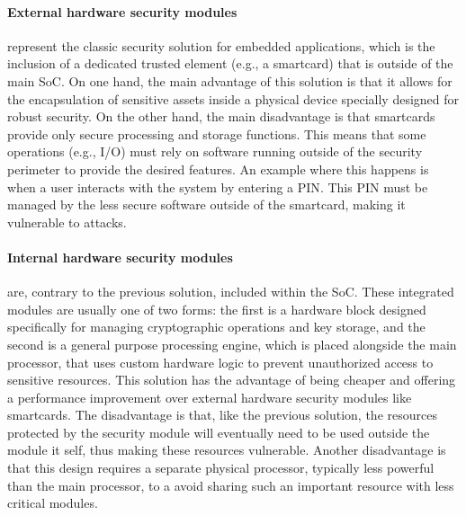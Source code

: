 \paragraph{\textbf{External hardware security modules}} represent the classic security solution for embedded applications, which is the inclusion of a dedicated trusted element (e.g., a smartcard) that is outside of the main \ac{SoC}. On one hand, the main advantage of this solution is that it allows for the encapsulation of sensitive assets inside a physical device specially designed for robust security. On the other hand, the main disadvantage is that smartcards provide only secure processing and storage functions. This means that some operations (e.g., I/O) must rely on software running outside of the security perimeter to provide the desired features. An example where this happens is when a user interacts with the system by entering a \ac{PIN}. This \ac{PIN} must be managed by the less secure software outside of the smartcard, making it vulnerable to attacks.

\paragraph{\textbf{Internal hardware security modules}} are, contrary to the previous solution, included within the \ac{SoC}. These integrated modules are usually one of two forms: the first is a hardware block designed specifically for managing cryptographic operations and key storage, and the second is a general purpose processing engine, which is placed alongside the main processor, that uses custom hardware logic to prevent unauthorized access to sensitive resources. This solution has the advantage of being cheaper and offering a performance improvement over external hardware security modules like smartcards. The disadvantage is that, like the previous solution, the resources protected by the security module will eventually need to be used outside the module it self, thus making these resources vulnerable. Another disadvantage is that this design requires a separate physical processor, typically less powerful than the main processor, to a avoid sharing such an important resource with less critical modules. %

